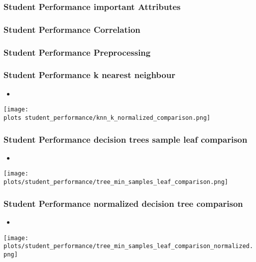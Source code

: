 \documentclass[aspectratio=169]{beamer}
\def \plots {./plots/}
\begin{document}
\begin{frame}{}
\frametitle{Student Performance important Attributes}
\end{frame}

\begin{frame}{}
\frametitle{Student Performance Correlation}
\end{frame}

\begin{frame}{}
\frametitle{Student Performance Preprocessing}
\end{frame}

\begin{frame}{}
\frametitle{Student Performance k nearest neighbour}
\begin{minipage}{0.30\textwidth}
\begin{itemize}
\item  %
\end{itemize}
\end{minipage}
\begin{minipage}{0.69\textwidth}
    \texttt{[image: \\plots student\_performance/knn\_k\_normalized\_comparison.png]}
\end{minipage}
\end{frame}

\begin{frame}{}
\frametitle{Student Performance decision trees sample leaf comparison}
\begin{minipage}{0.30\textwidth}
\begin{itemize}
\item  %
\end{itemize}
\end{minipage}
\begin{minipage}{0.69\textwidth}
    \texttt{[image: plots/student\_performance/tree\_min\_samples\_leaf\_comparison.png]}
\end{minipage}
\end{frame}


\begin{frame}{}
\frametitle{Student Performance normalized decision tree comparison}
\begin{minipage}{0.30\textwidth}
\begin{itemize}
\item  %
\end{itemize}
\end{minipage}
\begin{minipage}{0.69\textwidth}
    \texttt{[image: plots/student\_performance/tree\_min\_samples\_leaf\_comparison\_normalized.png]}
\end{minipage}
\end{frame}
\end{document}
